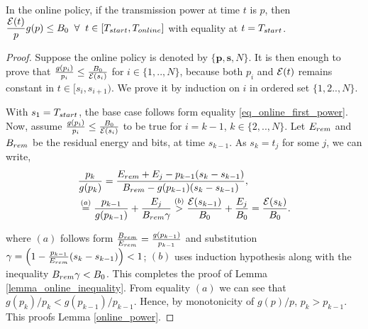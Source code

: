 \begin{lemma}
In the online policy, if the transmission power at time $t$ is $p$, then $\dfrac{\ETx(t)}{{p}}g(p) \le B_0\;\;\forall\;\; t\in [T_{\mbox{\scriptsize{start}}}, T_{\mbox{\scriptsize{online}}}]$ with equality at $t=T_{\mbox{\scriptsize{start}}}$.
\label{lemma_online_inequality}
\end{lemma}




\begin{proof}
Suppose the online policy is denoted by $\{\bm{p},\bm{s},N\}$. It is then enough to prove that $\frac{g(p_i)}{p_i} \le \frac{B_0}{\mathcal{E}(s_i)}$ for $i\in\{1,..,N\} $, because both $p_i$ and $\mathcal{E}(t)$ remains constant in $t\in[s_i,s_{i+1})$. We prove it by induction on $i$ in ordered set $\{1,2..,N\}$. 

With $s_1=T_{\mbox{\scriptsize{start}}}$, the base case follows form equality \eqref{eq_online_first_power}. Now, assume $\frac{g(p_i)}{p_i}\le \frac{B_0}{\mathcal{E}(s_i)}$ to be true for $i=k-1$, $k\in \{2,..,N\}$. Let $E_{\mbox{\scriptsize{rem}}}$ and $B_{\mbox{\scriptsize{rem}}}$ be the residual energy and bits, at time $s_{k-1}$. As $s_k=t_j$ for some $j$, we can write,
\begin{align*}
&\frac{p_{k}}{g(p_{k})}=\frac{E_{\mbox{\scriptsize{rem}}}+E_{j}-p_{k-1} (s_k-s_{k-1})}{B_{\mbox{\scriptsize{rem}}}-g(p_{k-1}) (s_k-s_{k-1})},
\\
&\stackrel{(a)}{=}\frac{p_{k-1}}{g(p_{k-1})}+\frac{E_{j}}{B_{\mbox{\scriptsize{rem}}}\gamma}
\stackrel{(b)}{>}\frac{\ETx(s_{k-1})}{B_0}+\frac{E_{j}}{B_0}=\frac{{\ETx(s_{k})}}{B_0}.
\end{align*}

where $(a)$ follows form $\frac{B_{\mbox{\scriptsize{rem}}}}{E_{\mbox{\scriptsize{rem}}}}=\frac{g(p_{k-1})}{p_{k-1}}$ and substitution $\gamma=\left( 1-\frac{p_{k-1}}{E_{\mbox{\scriptsize{rem}}}} (s_k-s_{k-1})\right)< 1$;  $(b)$ uses induction hypothesis along with the inequality $B_{\mbox{\scriptsize{rem}}}\gamma< B_0$. This completes the proof of Lemma \ref{lemma_online_inequality}. From equality $(a)$ we can see that $g(p_k)/p_k<g(p_{k-1})/p_{k-1}$. Hence, by monotonicity of $g(p)/p$, $p_{k}>p_{k-1}$. This proofs Lemma \ref{online_power}.
\end{proof}



